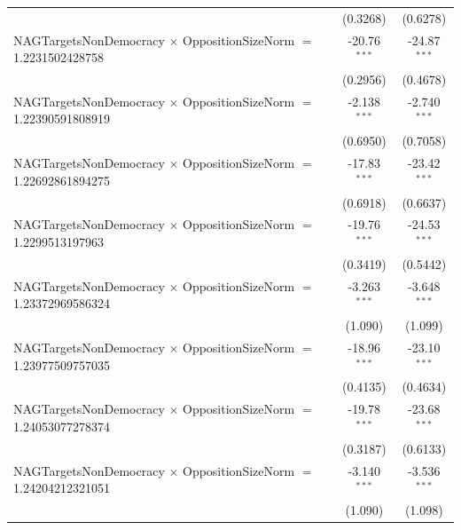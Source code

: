 \begin{tabular}{lcc}
                                                                                & (0.3268)             & (0.6278)\\   
   NAGTargetsNonDemocracy $\times$ OppositionSizeNorm $=$ 1.2231502428758       & -20.76$^{***}$       & -24.87$^{***}$\\   
                                                                                & (0.2956)             & (0.4678)\\   
   NAGTargetsNonDemocracy $\times$ OppositionSizeNorm $=$ 1.22390591808919      & -2.138$^{***}$       & -2.740$^{***}$\\   
                                                                                & (0.6950)             & (0.7058)\\   
   NAGTargetsNonDemocracy $\times$ OppositionSizeNorm $=$ 1.22692861894275      & -17.83$^{***}$       & -23.42$^{***}$\\   
                                                                                & (0.6918)             & (0.6637)\\   
   NAGTargetsNonDemocracy $\times$ OppositionSizeNorm $=$ 1.2299513197963       & -19.76$^{***}$       & -24.53$^{***}$\\   
                                                                                & (0.3419)             & (0.5442)\\   
   NAGTargetsNonDemocracy $\times$ OppositionSizeNorm $=$ 1.23372969586324      & -3.263$^{***}$       & -3.648$^{***}$\\   
                                                                                & (1.090)              & (1.099)\\   
   NAGTargetsNonDemocracy $\times$ OppositionSizeNorm $=$ 1.23977509757035      & -18.96$^{***}$       & -23.10$^{***}$\\   
                                                                                & (0.4135)             & (0.4634)\\   
   NAGTargetsNonDemocracy $\times$ OppositionSizeNorm $=$ 1.24053077278374      & -19.78$^{***}$       & -23.68$^{***}$\\   
                                                                                & (0.3187)             & (0.6133)\\   
   NAGTargetsNonDemocracy $\times$ OppositionSizeNorm $=$ 1.24204212321051      & -3.140$^{***}$       & -3.536$^{***}$\\   
                                                                                & (1.090)              & (1.098)\\   

\end{tabular}
